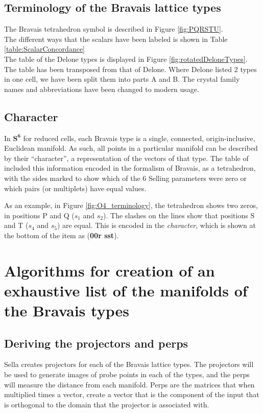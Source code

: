 \documentclass[preprint]{iucr}              %
\newcommand{\SVI}[0]{$\mathbf{S^{6}}$}
\newcommand{\scalarsub}[2]{$#1_#2$}
\newcommand{\charseq}[1]{({\bf #1})}
\begin{document}
	\subsection{Terminology of the Bravais lattice types}
	The Bravais tetrahedron symbol is described in Figure \ref{fig:PQRSTU}.\\
	The different ways that the scalars have been labeled is shown in Table \ref{table:ScalarConcordance} \\
	The table of the Delone types is displayed in Figure \ref{fig:rotatedDeloneTypes}. The table has been transposed from that of Delone. Where Delone listed 2 types in one cell, we have been split them into parts A and B. The crystal family names and abbreviations have been changed to modern usage. \\
	
	\subsection{Character}
	In \SVI{} for reduced cells, each Bravais type is a single, connected,
	origin-inclusive, Euclidean manifold. As such, all points in a
	particular manifold can be described by their ``character'', 
	a representation of the vectors of that type. The table of  included this information 
	encoded in the formalism of Bravais, as a tetrahedron, with
	the sides marked to show which of the 6 Selling parameters were
	zero or which pairs (or multiplets) have equal values. 
	
	As an example, in Figure \ref{fig:O4_terminology}, the tetrahedron shows two
	zeros, in positions P and Q (\scalarsub{s}{1} and \scalarsub{s}{2}). The slashes on the lines
	show that positions S and T (\scalarsub{s}{4} and \scalarsub{s}{5}) are equal. This is 
	encoded in the \textit{character}, which is shown at the bottom of the item as \charseq{00r sst}.
	
	\section{Algorithms for creation of an exhaustive list of the manifolds of the Bravais types}
	
	\subsection{Deriving the projectors and perps}
	
	Sella creates projectors for each of the Bravais
	lattice types. The projectors will be used to generate
	images of probe points in each of the types, and the perps
	will measure the distance from each manifold. Perps
	are the matrices that when multiplied times a vector,
	create a vector that is the component of the input 
	that is orthogonal to the domain that the projector
	is associated with.
	
\end{document}
